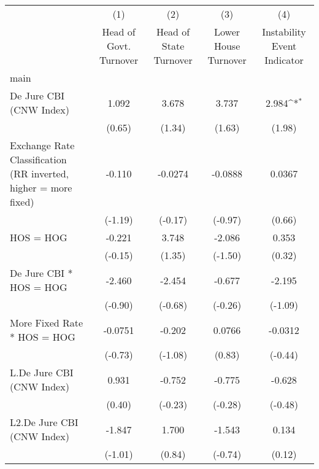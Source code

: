 {
\def\sym#1{\ifmmode^{#1}\else\(^{#1}\)\fi}
\begin{tabular}{l*{4}{c}}
\hline\hline
                &\multicolumn{1}{c}{(1)}&\multicolumn{1}{c}{(2)}&\multicolumn{1}{c}{(3)}&\multicolumn{1}{c}{(4)}\\
                &\multicolumn{1}{c}{Head of Govt. Turnover}&\multicolumn{1}{c}{Head of State Turnover}&\multicolumn{1}{c}{Lower House Turnover}&\multicolumn{1}{c}{Instability Event Indicator}\\
\hline
main            &                  &                  &                  &                  \\
De Jure CBI (CNW Index)&    1.092         &    3.678         &    3.737         &    2.984\sym{*}  \\
                &   (0.65)         &   (1.34)         &   (1.63)         &   (1.98)         \\
[1em]
Exchange Rate Classification (RR inverted, higher = more fixed)&   -0.110         &  -0.0274         &  -0.0888         &   0.0367         \\
                &  (-1.19)         &  (-0.17)         &  (-0.97)         &   (0.66)         \\
[1em]
HOS = HOG       &   -0.221         &    3.748         &   -2.086         &    0.353         \\
                &  (-0.15)         &   (1.35)         &  (-1.50)         &   (0.32)         \\
[1em]
De Jure CBI * HOS = HOG&   -2.460         &   -2.454         &   -0.677         &   -2.195         \\
                &  (-0.90)         &  (-0.68)         &  (-0.26)         &  (-1.09)         \\
[1em]
More Fixed Rate * HOS = HOG&  -0.0751         &   -0.202         &   0.0766         &  -0.0312         \\
                &  (-0.73)         &  (-1.08)         &   (0.83)         &  (-0.44)         \\
[1em]
L.De Jure CBI (CNW Index)&    0.931         &   -0.752         &   -0.775         &   -0.628         \\
                &   (0.40)         &  (-0.23)         &  (-0.28)         &  (-0.48)         \\
[1em]
L2.De Jure CBI (CNW Index)&   -1.847         &    1.700         &   -1.543         &    0.134         \\
                &  (-1.01)         &   (0.84)         &  (-0.74)         &   (0.12)         \\

\end{tabular}}
